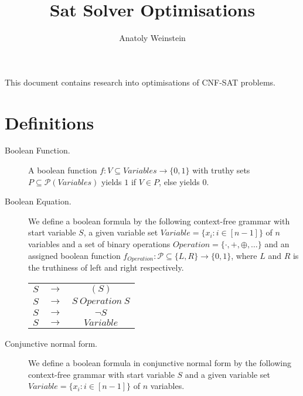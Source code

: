 \documentclass[12pt, letterpaper]{article}
\title{Sat Solver Optimisations}
\author{Anatoly Weinstein}
\begin{document}
    \maketitle

    This document contains research into optimisations of CNF-SAT problems.

    \section{Definitions}

    \begin{description}
        \item[Boolean Function.]

            A boolean function $f: V \subseteq Variables \rightarrow
            \{0, 1\}$ with truthy sets $P \subseteq \mathcal{P}(Variables)$
            yields $1$ if $V \in P$, else yields $0$.
        
        \item[Boolean Equation.]

            We define a boolean formula by the following context-free
            grammar with start variable $S$, a given variable set
            $Variable = \{x_i : i \in [n-1]\}$ of $n$ variables and a
            set of binary operations $Operation = \{\cdot, +, \oplus,
            \dots\}$ and an assigned boolean function $f_{Operation}
            : \mathcal{P} \subseteq \{L, R\} \rightarrow \{0, 1\}$,
            where $L$ and $R$ is the truthiness of left and right 
            respectively.

            \begin{tabular}{ccc}
                $S$ & $\rightarrow$& $(S)$ \\ 
                $S$ & $\rightarrow$& $S\ Operation\ S$ \\ 
                $S$ & $\rightarrow$& $\lnot S$ \\ 
                $S$ & $\rightarrow$& $Variable$ \\ 
            \end{tabular}
        
        \item[Conjunctive normal form.]

            We define a boolean formula in conjunctive normal form by
            the following context-free grammar with start variable $S$
            and a given variable set $Variable = \{x_i : i \in [n-1]\}$
            of $n$ variables.


\end{description}
\end{document}
